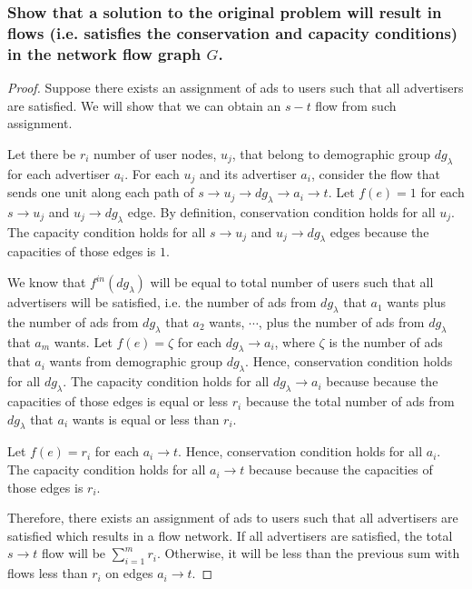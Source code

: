 \documentclass[11pt]{scrartcl}
\begin{document}
\subsubsection{
	Show that a solution to the original problem will result in flows (i.e. satisfies
	the conservation and capacity conditions) in the network flow graph $G$.
}
\begin{proof}
	Suppose there exists an assignment of ads to users such that all advertisers are satisfied.
	We will show that we can obtain an $s-t$ flow from such assignment.

	Let there be $r_i$ number of user nodes, $u_j$, that belong to demographic group $dg_\lambda$ for each
	advertiser $a_i$. For each $u_j$ and its advertiser $a_i$, consider the flow that sends one unit
	along each path of $s \rightarrow u_j \rightarrow dg_\lambda \rightarrow a_i \rightarrow t$.
	Let $f(e)=1$ for each $s \rightarrow u_j$ and $u_j \rightarrow dg_\lambda$ edge.
	By definition, conservation condition holds for all $u_j$.
	The capacity condition holds for all $s \rightarrow u_j$ and $u_j \rightarrow dg_\lambda$ edges
	because the capacities of those edges is $1$.

	We know that $f^{in}(dg_\lambda)$ will be equal to total number of users such that 
	all advertisers will be satisfied, i.e. the number of ads from $dg_\lambda$ that $a_1$ wants 
	plus the number of ads from $dg_\lambda$ that $a_2$ wants, $\cdots$, 
	plus the number of ads from $dg_\lambda$ that $a_m$ wants. 
	Let $f(e)=\zeta$ for each $dg_\lambda \rightarrow a_i$, where $\zeta$ is the number of ads 
	that $a_i$ wants from demographic group $dg_\lambda$.
	Hence, conservation condition holds for all $dg_\lambda$.
	The capacity condition holds for all $dg_\lambda \rightarrow a_i$ because
	because the capacities of those edges is equal or less $r_i$ because the total number of
	ads from $dg_\lambda$ that $a_i$ wants is equal or less than $r_i$.

	Let $f(e)=r_i$ for each $a_i \rightarrow t$. Hence, conservation condition holds for all $a_i$.
	The capacity condition holds for all $a_i \rightarrow t$ because
	because the capacities of those edges is $r_i$.

	Therefore, there exists an assignment of ads to users such that all advertisers are satisfied
	which results in a flow network. If all advertisers are satisfied, the total $s \rightarrow t$ flow
	will be $\sum_{i=1}^m r_i$. Otherwise, it will be less than the previous sum with flows less than $r_i$
	on edges $a_i \rightarrow t$.
\end{proof}
\end{document}
